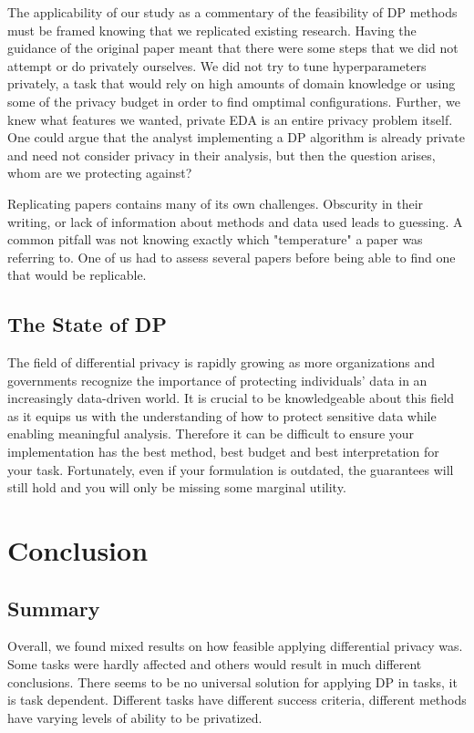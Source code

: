 \documentclass[12pt,letterpaper]{article}
\begin{document}
The applicability of our study as a commentary of the feasibility of DP methods must be framed knowing that we replicated existing research. Having the guidance of the original paper meant that there were some steps that we did not attempt or do privately ourselves. We did not try to tune hyperparameters privately, a task that would rely on high amounts of domain knowledge or using some of the privacy budget in order to find omptimal configurations. Further, we knew what features we wanted, private EDA is an entire privacy problem itself. One could argue that the analyst implementing a DP algorithm is already private and need not consider privacy in their analysis, but then the question arises, whom are we protecting against?

Replicating papers contains many of its own challenges. Obscurity in their writing, or lack of information about methods and data used leads to guessing. A common pitfall was not knowing exactly which "temperature" a paper was referring to. One of us had to assess several papers before being able to find one that would be replicable.


\subsection{The State of DP}
The field of differential privacy is rapidly growing as more organizations and governments recognize the importance of protecting individuals' data in an increasingly data-driven world. It is crucial to be knowledgeable about this field as it equips us with the understanding of how to protect sensitive data while enabling meaningful analysis. Therefore it can be difficult to ensure your implementation has the best method, best budget and best interpretation for your task. Fortunately, even if your formulation is outdated, the guarantees will still hold and you will only be missing some marginal utility. 


\section{Conclusion}


\subsection{Summary}
Overall, we found mixed results on how feasible applying differential privacy was. Some tasks were hardly affected and others would result in much different conclusions. There seems to be no universal solution for applying DP in tasks, it is task dependent. Different tasks have different success criteria, different methods have varying levels of ability to be privatized.
\end{document}
